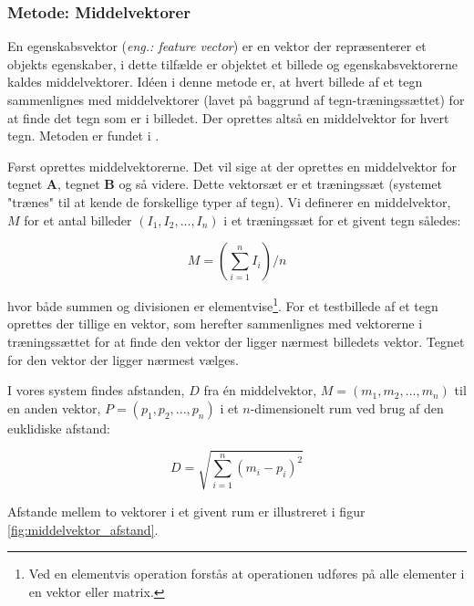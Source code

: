 \subsubsection*{Metode: Middelvektorer}
En egenskabsvektor (\textit{eng.: feature vector}) er en vektor der repræsenterer et objekts egenskaber, i dette tilfælde er objektet et billede og egenskabsvektorerne kaldes middelvektorer. Idéen i denne metode er, at hvert billede af et tegn sammenlignes med middelvektorer (lavet på baggrund af tegn-træningssættet) for at finde det tegn som er i billedet. Der oprettes altså en middelvektor for hvert tegn. Metoden er fundet i \cite{arth}.

Først oprettes middelvektorerne. Det vil sige at der oprettes en middelvektor for tegnet \textbf{A}, tegnet \textbf{B} og så videre. Dette vektorsæt er et træningssæt (systemet "trænes" til at kende de forskellige typer af tegn). Vi definerer en middelvektor, $M$ for et antal billeder $(I_{1},I_{2},...,I_{n})$ i et træningssæt for et givent tegn således:

\begin{displaymath}
	M = (\sum_{i=1}^{n}I_i)/n
\end{displaymath}


hvor både summen og divisionen er elementvise\footnote{Ved en elementvis operation forstås at operationen udføres på alle elementer i en vektor eller matrix.}. For et testbillede af et tegn oprettes der tillige en vektor, som herefter sammenlignes med vektorerne i træningssættet for at finde den vektor der ligger nærmest billedets vektor. Tegnet for den vektor der ligger nærmest vælges.

I vores system findes afstanden, $D$ fra én middelvektor, $M = (m_{1},m_{2},...,m_{n})$ til en anden vektor, $P = (p_{1},p_{2},...,p_{n})$ i et $n$-dimensionelt rum ved brug af den euklidiske afstand\cite{wiki_euclid}:

\begin{displaymath}
	D = \sqrt{\sum_{i=1}^{n}(m_{i}-p_{i})^{2}}
\end{displaymath}

Afstande mellem to vektorer i et givent rum er illustreret i figur \vref{fig:middelvektor_afstand}.

